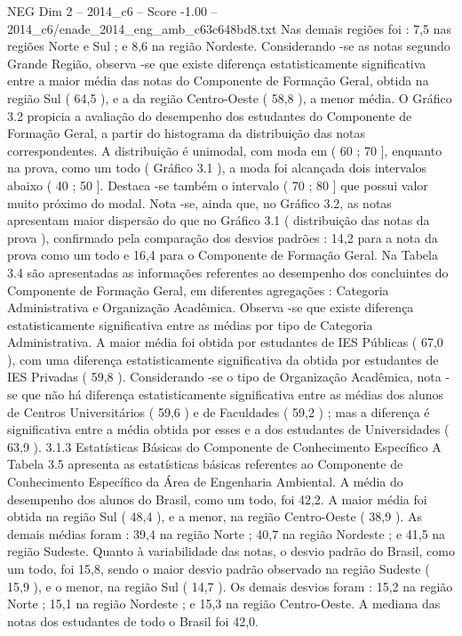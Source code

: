 \begin{textsample}{NEG Dim 2 – 2014\_c6 – Score -1.00 – 2014\_c6/enade\_2014\_eng\_amb\_c63c648bd8.txt}
Nas demais regiões foi : 7,5 nas regiões Norte e Sul ; e 8,6 na região Nordeste.
Considerando -se as notas segundo Grande Região, observa -se que existe diferença estatisticamente significativa entre a maior média das notas do Componente de Formação Geral, obtida na região Sul ( 64,5 ), e a da região Centro-Oeste ( 58,8 ), a menor média.
O Gráfico 3.2 propicia a avaliação do desempenho dos estudantes do Componente de Formação Geral, a partir do histograma da distribuição das notas correspondentes.
A distribuição é unimodal, com moda em ( 60 ; 70 ], enquanto na prova, como um todo ( Gráfico 3.1 ), a moda foi alcançada dois intervalos abaixo ( 40 ; 50 ].
Destaca -se também o intervalo ( 70 ; 80 ] que possui valor muito próximo do modal.
Nota -se, ainda que, no Gráfico 3.2, as notas apresentam maior dispersão do que no Gráfico 3.1 ( distribuição das notas da prova ), confirmado pela comparação dos desvios padrões : 14,2 para a nota da prova como um todo e 16,4 para o Componente de Formação Geral.
Na Tabela 3.4 são apresentadas as informações referentes ao desempenho dos concluintes do Componente de Formação Geral, em diferentes agregações : Categoria Administrativa e Organização Acadêmica.
Observa -se que existe diferença estatisticamente significativa entre as médias por tipo de Categoria Administrativa.
A maior média foi obtida por estudantes de IES Públicas ( 67,0 ), com uma diferença estatisticamente significativa da obtida por estudantes de IES Privadas ( 59,8 ).
Considerando -se o tipo de Organização Acadêmica, nota -se que não há diferença estatisticamente significativa entre as médias dos alunos de Centros Universitários ( 59,6 ) e de Faculdades ( 59,2 ) ; mas a diferença é significativa entre a média obtida por esses e a dos estudantes de Universidades ( 63,9 ). 3.1.3 Estatísticas Básicas do Componente de Conhecimento Específico A Tabela 3.5 apresenta as estatísticas básicas referentes ao Componente de Conhecimento Específico da Área de Engenharia Ambiental.
A média do desempenho dos alunos do Brasil, como um todo, foi 42,2.
A maior média foi obtida na região Sul ( 48,4 ), e a menor, na região Centro-Oeste ( 38,9 ).
As demais médias foram : 39,4 na região Norte ; 40,7 na região Nordeste ; e 41,5 na região Sudeste.
Quanto à variabilidade das notas, o desvio padrão do Brasil, como um todo, foi 15,8, sendo o maior desvio padrão observado na região Sudeste ( 15,9 ), e o menor, na região Sul ( 14,7 ).
Os demais desvios foram : 15,2 na região Norte ; 15,1 na região Nordeste ; e 15,3 na região Centro-Oeste.
A mediana das notas dos estudantes de todo o Brasil foi 42,0.

\end{textsample}
